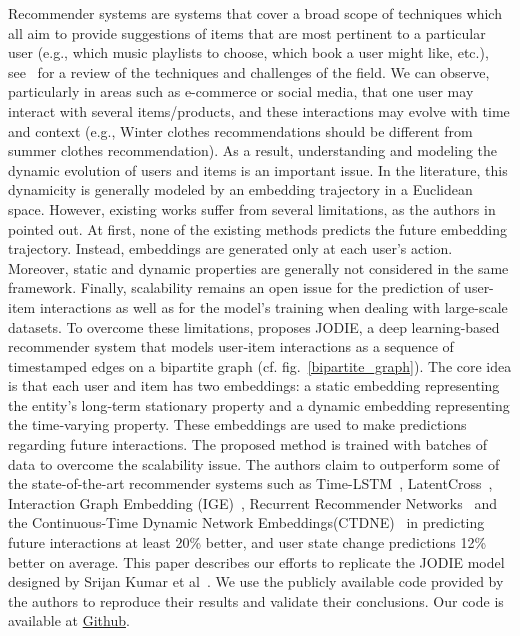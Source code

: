 Recommender systems are systems that cover a broad scope of techniques which all aim to provide suggestions of items that are most pertinent to a particular user (e.g., which music playlists to choose, which book a user might like, etc.), see~\cite{Ricci_Rokach_Shapira_2021} for a review of the techniques and challenges of the field. We can observe, particularly in areas such as  e-commerce or social media, that one user may interact with several items/products, and these interactions may evolve with time and context (e.g., Winter clothes recommendations should be different from summer clothes recommendation). 
As a result,  understanding and modeling the dynamic evolution of users and items is an important issue. In the literature, this dynamicity is generally modeled by an embedding trajectory in a Euclidean space. However, existing works suffer from several limitations, as the authors in \cite{kumar2019predicting} pointed out. At first, none of the existing methods predicts the future embedding trajectory. Instead, embeddings are generated only at each user's action. Moreover, static and dynamic properties are generally not considered in the same framework. Finally, scalability remains an open issue for the prediction of user-item interactions as well as for the model's training when dealing with large-scale datasets. To overcome these limitations, \cite{kumar2019predicting} proposes JODIE, a deep learning-based recommender system that models user‐item interactions as a sequence of timestamped edges on a bipartite graph (cf. fig.~\ref{bipartite_graph}).
The core idea is that each user and item has two embeddings: a static embedding representing the entity's long‐term stationary property
and a dynamic embedding representing the time‐varying property. These embeddings are used to make predictions regarding future interactions. The proposed method is trained with batches of data to overcome the scalability issue.
The authors claim to outperform some of the state-of-the-art recommender systems such as Time-LSTM~\cite{Zhu17}, LatentCross~\cite{Beutel18}, Interaction Graph Embedding (IGE)~\cite{Zhang17}, Recurrent Recommender Networks~\cite{Wu17} and the Continuous-Time Dynamic Network Embeddings(CTDNE)~\cite{Nguyen18} in predicting future interactions  at least 20\% better, and user state change predictions 12\% better on average.
This paper describes our efforts to replicate the JODIE model designed by Srijan Kumar et al~\cite{kumar2019predicting}. 
We use the publicly available code provided by the authors to reproduce
their results and validate their conclusions. Our code is available at \href{https://github.com/ComplexNetTSP/JODIE}{Github}.


